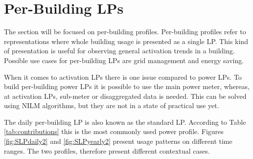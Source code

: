 \section{Per-Building LPs}
\label{sec:per_building}
The section will be focused on per-building profiles.
Per-building profiles refer to representations where whole building usage is presented as a single LP.
This kind of presentation is useful for observing general activation trends in a building.
Possible use cases for per-building LPs are grid management and energy saving.

When it comes to activation LPs there is one issue compared to power LPs.
To build per-building power LPs it is possible to use the main power meter, whereas, at activation LPs, sub-meter or disaggregated data is needed.
This can be solved using NILM algorithms, but they are not in a state of practical use yet.

The daily per-building LP is also known as the standard LP. 
According to Table \ref{tab:contributions} this is the most commonly used power profile.
Figures \ref{fig:SLPdaily2} and \ref{fig:SLPyearly2} present usage patterns on different time ranges. 
The two profiles, therefore present different contextual cases.


